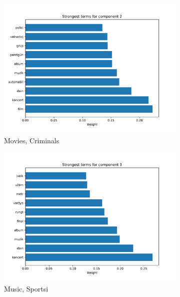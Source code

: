 \documentclass{article}
\begin{document}
\begin{figure}[H]
\begin{subfigure}{.6\textwidth}
		\includegraphics[width=1\linewidth]{images/2_component_lsa.pdf}
		\caption{Movies, Criminals}
		\label{fig:sfig3}
	\end{subfigure}
	\begin{subfigure}{.6\textwidth}
		\centering
		\includegraphics[width=1\linewidth]{images/3_component_lsa.pdf}
		\caption{Music, Sportsi}
		\label{fig:sfig4}
	\end{subfigure}
	\begin{subfigure}{.6\textwidth}
		\centering

\end{subfigure}
\end{figure}
\end{document}
